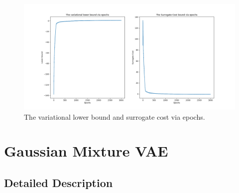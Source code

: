 \documentclass[a4paper]{article}
\begin{document}
\begin{figure}[!htbp]
\begin{center}
\includegraphics[width=18cm]{imgs/cost_lb.png}
\end{center}
\caption{The variational lower bound and surrogate cost via epochs.}\label{datavis}
\end{figure}








\section{Gaussian Mixture VAE}

\subsection{Detailed Description}
\end{document}
